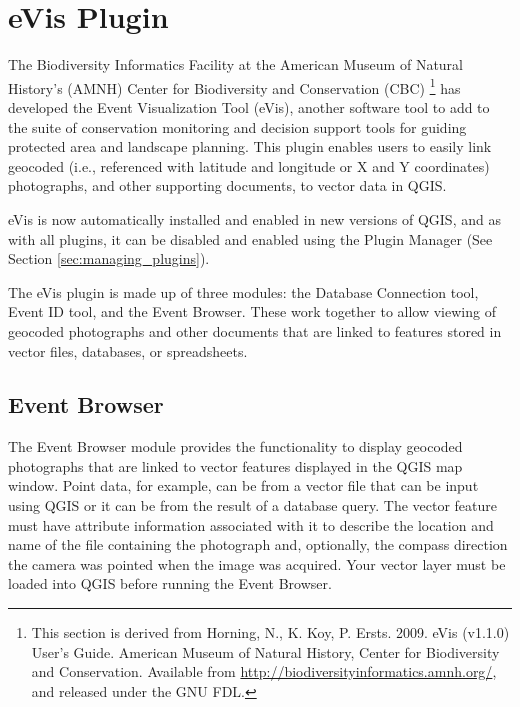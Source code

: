 
\section{eVis Plugin}\label{sec:evis}

The Biodiversity Informatics Facility at the American Museum of Natural History's (AMNH) Center
for Biodiversity and Conservation (CBC) \footnote{This section is derived from Horning, N., K.
Koy, P. Ersts. 2009. eVis (v1.1.0) User's Guide. American Museum of
Natural History, Center for Biodiversity and Conservation. Available from
\url{http://biodiversityinformatics.amnh.org/}, and released under the GNU FDL.} has developed the
Event Visualization Tool (eVis),
another software tool to add to the suite of conservation monitoring and decision support tools
for guiding protected area and landscape planning. This plugin enables users to easily link
geocoded (i.e., referenced with latitude and longitude or X and Y coordinates) photographs,
and other supporting documents, to vector data in QGIS.

eVis is now automatically installed and enabled in new versions of QGIS, and as with all plugins,
it can be disabled and enabled using the Plugin Manager (See Section \ref{sec:managing_plugins}).

The eVis plugin is made up of three modules: the Database Connection tool, Event ID tool, and
the Event Browser. These work together to allow viewing of geocoded photographs and other documents
that are linked to features stored in vector files, databases, or spreadsheets.

\subsection{Event Browser}\label{evis_browser}

The Event Browser module provides the functionality to display geocoded photographs that are linked
to vector features displayed in the QGIS map window. Point data, for example, can be from a vector
file that can be input using QGIS or it can be from the result of a database query. The vector
feature must have attribute information associated with it to describe the location and name of the
file containing the photograph and, optionally, the compass direction the camera was pointed when
the image was acquired. Your vector layer must be loaded into QGIS before running the Event Browser.

\label{evis_launch_browser}

